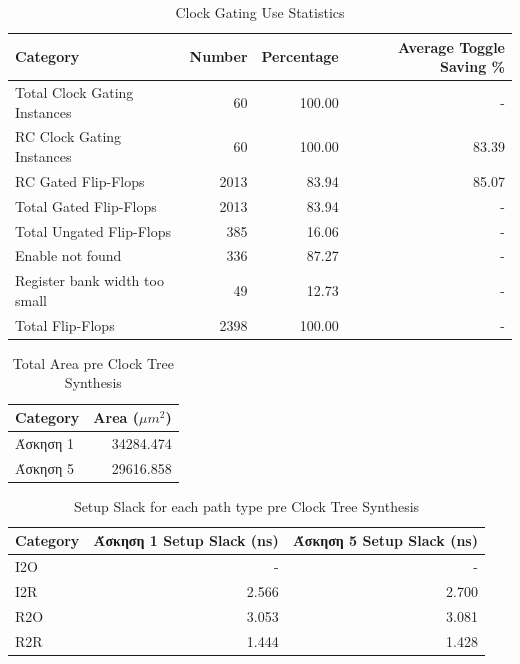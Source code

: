 \begin{table}[H]
    \centering
    \caption{Clock Gating Use Statistics}
    \begin{tabular}{lrrr}
        \toprule
        Category & Number & Percentage & Average Toggle Saving \% \\
        \midrule
        Total Clock Gating Instances & 60 & 100.00 & - \\
        RC Clock Gating Instances & 60 & 100.00 & 83.39 \\
        RC Gated Flip-Flops & 2013 & 83.94 & 85.07 \\
        Total Gated Flip-Flops & 2013 & 83.94 & - \\
        Total Ungated Flip-Flops & 385 & 16.06 & - \\
        Enable not found & 336 & 87.27 & - \\
        Register bank width too small & 49 & 12.73 & - \\
        Total Flip-Flops & 2398 & 100.00 & - \\
        \bottomrule
    \end{tabular}
\end{table}

\begin{table}[H]
    \centering
    \caption{Total Area pre Clock Tree Synthesis}
    \begin{tabular}{lr}
        \toprule
        Category & Area ($\mu m^2$) \\
        \midrule
        Άσκηση 1 & 34284.474 \\
        Άσκηση 5 & 29616.858 \\
        \bottomrule
    \end{tabular}
\end{table}

\begin{table}[H]
    \centering
    \caption{Setup Slack for each path type pre Clock Tree Synthesis}
    \begin{tabular}{lrr}
        \toprule
        Category & Άσκηση 1 Setup Slack (ns) & Άσκηση 5 Setup Slack (ns) \\
        \midrule
        I2O & - & - \\
        I2R & 2.566 & 2.700 \\
        R2O & 3.053 & 3.081 \\
        R2R & 1.444 & 1.428 \\
        \bottomrule
    \end{tabular}
\end{table}

